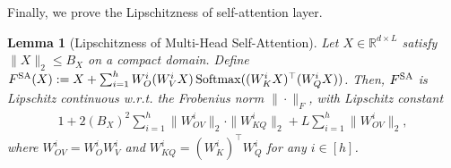 \documentclass[12pt]{article}
\numberwithin{equation}{section}
\newcommand{\Softmax}{\mathop{{\rm Softmax}}}
\def\R{\mathbb{R}}
\theoremstyle{theoremstyle}
\newtheorem{lemma}{Lemma}[section]
\numberwithin{equation}{section}
\numberwithin{theorem}{section}
\numberwithin{proposition}{section}
\numberwithin{definition}{section}
\numberwithin{lemma}{section}
\numberwithin{assumption}{section}
\numberwithin{remark}{section}
\begin{document}
Finally, we prove the Lipschitzness of self-attention layer.

\begin{lemma}[Lipschitzness of Multi-Head Self-Attention]\label{lem:lipschtzness_of_self_attention}
Let $X\in\R^{d\times L}$ satisfy $\|X\|_2 \le B_X$ on a compact domain.  
Define $F^{\rm SA}(X):=X+\sum_{i=1}^hW_O^i(W_V^iX)\Softmax((W_K^iX)^\top(W_Q^iX))$.
Then, $F^{\rm SA}$ is Lipschitz continuous w.r.t. the Frobenius norm $\|\cdot\|_F$, with Lipschitz constant
\begin{align*}
    1+2(B_X)^2\sum_{i=1}^h\|W^i_{OV}\|_2\cdot\|W^i_{KQ}\|_2+L\sum_{i=1}^h\|W^i_{OV}\|_2,
\end{align*}
where $W^i_{OV} = W_O^i W_V^i$ and $W^i_{KQ} = (W_K^i)^\top W_Q^i$ for any $i \in [h]$.
\end{lemma}
\end{document}
